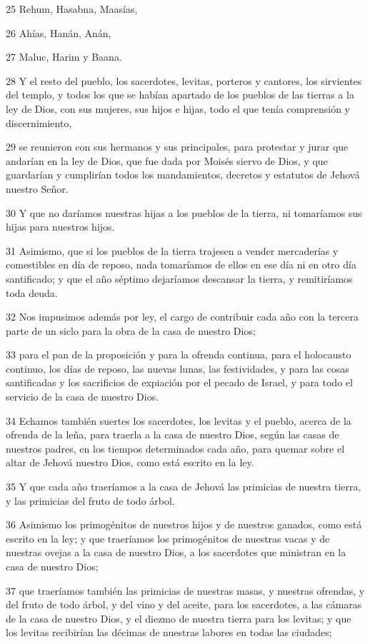 \par 25 Rehum, Hasabna, Maasías,
\par 26 Ahías, Hanán, Anán,
\par 27 Maluc, Harim y Baana.
\par 28 Y el resto del pueblo, los sacerdotes, levitas, porteros y cantores, los sirvientes del templo, y todos los que se habían apartado de los pueblos de las tierras a la ley de Dios, con sus mujeres, sus hijos e hijas, todo el que tenía comprensión y discernimiento,
\par 29 se reunieron con sus hermanos y sus principales, para protestar y jurar que andarían en la ley de Dios, que fue dada por Moisés siervo de Dios, y que guardarían y cumplirían todos los mandamientos, decretos y estatutos de Jehová nuestro Señor.
\par 30 Y que no daríamos nuestras hijas a los pueblos de la tierra, ni tomaríamos sus hijas para nuestros hijos. 
\par 31 Asimismo, que si los pueblos de la tierra trajesen a vender mercaderías y comestibles en día de reposo, nada tomaríamos de ellos en ese día ni en otro día santificado; y que el año séptimo dejaríamos descansar la tierra, y remitiríamos toda deuda. 
\par 32 Nos impusimos además por ley, el cargo de contribuir cada año con la tercera parte de un siclo   para la obra de la casa de nuestro Dios; 
\par 33 para el pan de la proposición y para la ofrenda continua, para el holocausto continuo, los días de reposo, las nuevas lunas, las festividades, y para las cosas santificadas y los sacrificios de expiación por el pecado de Israel, y para todo el servicio de la casa de nuestro Dios.
\par 34 Echamos también suertes los sacerdotes, los levitas y el pueblo, acerca de la ofrenda de la leña, para traerla a la casa de nuestro Dios, según las casas de nuestros padres, en los tiempos determinados cada año, para quemar sobre el altar de Jehová nuestro Dios, como está escrito en la ley.
\par 35 Y que cada año traeríamos a la casa de Jehová las primicias de nuestra tierra, y las primicias del fruto de todo árbol. 
\par 36 Asimismo los primogénitos de nuestros hijos y de nuestros ganados, como está escrito en la ley; y que traeríamos los primogénitos de nuestras vacas y de nuestras ovejas a la casa de nuestro Dios, a los sacerdotes que ministran en la casa de nuestro Dios; 
\par 37 que traeríamos también las primicias de nuestras masas, y nuestras ofrendas, y del fruto de todo árbol, y del vino y del aceite, para los sacerdotes, a las cámaras de la casa de nuestro Dios, y el diezmo de nuestra tierra para los levitas; y que los levitas recibirían las décimas de nuestras labores en todas las ciudades;
